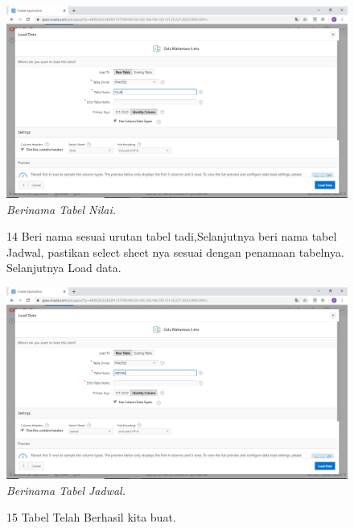 \begin{enumerate}
\begin{figure}
    \begin{center}
\includegraphics[scale=0.3]{figures/191.png}
    \caption{\textit{Berinama Tabel Nilai.}}
        \end{center}
\label{gambar}
\end{figure}

\begin{figure}
\item[14]Beri nama sesuai urutan tabel tadi,Selanjutnya beri nama tabel Jadwal, pastikan select sheet nya sesuai dengan penamaan tabelnya. Selanjutnya Load data. 

    \begin{center}
\includegraphics[scale=0.3]{figures/124.png}
    \caption{\textit{Berinama Tabel Jadwal.}}
        \end{center}
\label{gambar}
\end{figure}

\begin{figure}
\item[15]Tabel Telah Berhasil kita buat.


\end{figure}
\end{enumerate}
